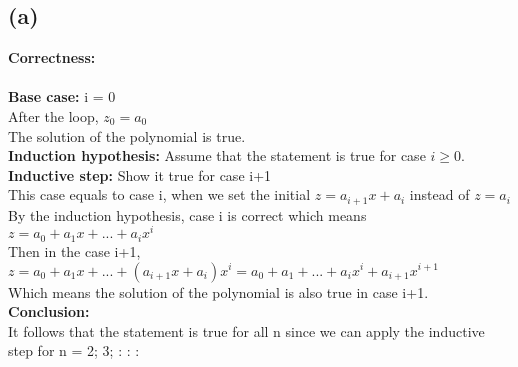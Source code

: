 \documentclass{article}
\begin{document}
\subsection{(a)}
\textbf{\large Correctness:}\\\\
\textbf{Base case:} i = 0\\
After the loop, $z_0=a_0$\\
The solution of the polynomial is true.\\
\textbf{Induction hypothesis:} Assume that the statement is true for case $i\geq 0$.\\
\textbf{Inductive step:} Show it true for case i+1\\
This case equals to case i, when we set the initial $z = a_{i+1}x+a_{i}$ instead of $z = a_{i}$\\
By the induction hypothesis, case i is correct which means $z = a_0 + a_1x + ... + a_ix^i$\\
Then in the case i+1, $z = a_0 + a_1x + ... + (a_{i+1}x+a_i)x^i = a_0 + a_1 + ... + a_ix^i + a_{i+1}x^{i+1}$\\
Which means the solution of the polynomial is also true in case i+1.\\
\textbf{Conclusion:}\\
It follows that the statement is true for all n since we can apply the inductive step for n = 2; 3; : : :
\end{document}
